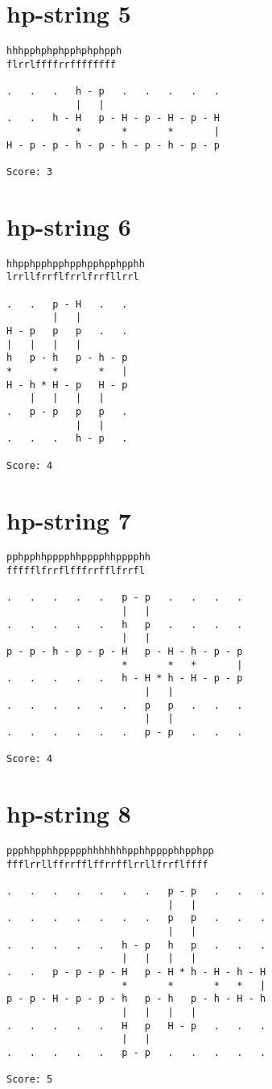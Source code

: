 \documentclass[a4paper,oneside,article,11pt]{memoir}
\begin{document}
\pagebreak

\section*{hp-string 5}
\begin{lstlisting}
hhhpphphphpphphphpph
flrrlffffrrffffffff

.   .   .   h - p   .   .   .   .   .
            |   |
.   .   h - H   p - H - p - H - p - H
            *       *       *       |
H - p - p - h - p - h - p - h - p - p

Score: 3
\end{lstlisting}

\section*{hp-string 6}
\begin{lstlisting}
hhpphpphpphpphpphpphpphh
lrrllfrrflfrrlfrrfllrrl

.   .   p - H   .   .
        |   |
H - p   p   p   .   .
|   |   |   |
h   p - h   p - h - p
*       *       *   |
H - h * H - p   H - p
    |   |   |   |
.   p - p   p   p   .
            |   |
.   .   .   h - p   .

Score: 4
\end{lstlisting}

\pagebreak

\section*{hp-string 7}
\begin{lstlisting}
pphpphhpppphhpppphhpppphh
ffffflfrrflfffrrfflfrrfl

.   .   .   .   .   p - p   .   .   .   .
                    |   |
.   .   .   .   .   h   p   .   .   .   .
                    |   |
p - p - h - p - p - H   p - H - h - p - p
                    *       *   *       |
.   .   .   .   .   h - H * h - H - p - p
                        |   |
.   .   .   .   .   .   p   p   .   .   .
                        |   |
.   .   .   .   .   .   p - p   .   .   .

Score: 4
\end{lstlisting}

\section*{hp-string 8}
\begin{lstlisting}
ppphhpphhppppphhhhhhhpphhpppphhpphpp
ffflrrllffrrfflffrrfflrrllfrrflffff

.   .   .   .   .   .   .   p - p   .   .   .
                            |   |
.   .   .   .   .   .   .   p   p   .   .   .
                            |   |
.   .   .   .   .   h - p   h   p   .   .   .
                    |   |   |   |
.   .   p - p - p - H   p - H * h - H - h - H
                    *       *       *   *   |
p - p - H - p - p - h   p - h   p - h - H - h
                    |   |   |   |
.   .   .   .   .   H   p   H - p   .   .   .
                    |   |
.   .   .   .   .   p - p   .   .   .   .   .

Score: 5
\end{lstlisting}
\end{document}
